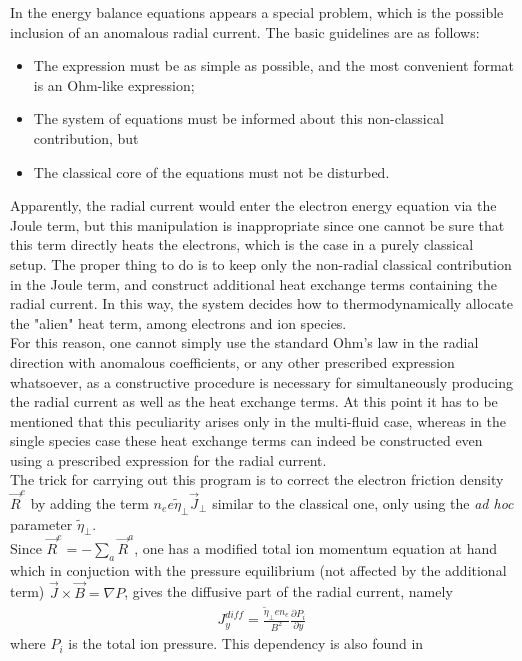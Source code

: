 \documentclass[a4paper,10pt]{report}
\begin{document}
In the energy balance equations
appears
a special problem, which is the
possible inclusion of an anomalous radial current.
The basic guidelines are as follows:
\begin{itemize}
\item The expression must be as simple as possible, and the most convenient
format is an Ohm-like expression;
\item The system of equations must be informed about this non-classical
contribution, but
\item The classical core of the equations must not be disturbed.
\end{itemize}
Apparently, the radial current would enter the electron energy equation
via the Joule term, but this manipulation is inappropriate since one cannot
be sure that this term directly heats the electrons, which is the case in
a purely classical setup. The proper thing to do is to keep only
the non-radial classical contribution in the Joule term, and
construct additional heat exchange terms
containing the radial current.
In this way, the system decides how to thermodynamically allocate the
"alien" heat term, among electrons and ion species.\\
For this reason, one cannot simply use the standard Ohm's
law in the radial direction with anomalous coefficients, or any other
prescribed expression whatsoever, as a constructive procedure is necessary
for simultaneously producing the radial current as well as the heat exchange
terms. At this point it has to be mentioned that this peculiarity arises
only in the multi-fluid case, whereas in the single species case
these heat exchange terms can indeed be constructed even using a prescribed
expression for the radial current. \\
The trick for carrying out this program is to correct the electron friction
density $\vec{R}^e$ by adding the term $n_e e \tilde{\eta}_\perp \vec{J}_\perp$
similar to the classical one, only using the {\itshape ad hoc} parameter
$\tilde{\eta}_\perp$. \\
Since $\vec{R}^e=-{\sum_{a}\vec{R}^a}$, one has a
modified total ion momentum equation at hand which in conjuction with the
pressure equilibrium (not affected by the additional term)
$\vec{J} \times \vec{B} =  \nabla P$, gives the diffusive part of the
radial current, namely
\begin{gather}
J_y^{diff}=\frac{\tilde{\eta}_\perp en_e}{B^2} \frac{\partial P_i}{\partial y}
\end{gather}
where $P_i$ is the total ion pressure. This dependency is also found in
\end{document}
